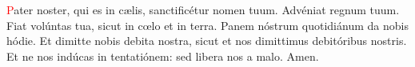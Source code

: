 \textcolor{red}{P}ater noster, qui es in c{\ae}lis, sanctificétur nomen tuum. Advéniat regnum tuum.
Fiat volúntas tua, sicut in c{\oe}lo et in terra. Panem nóstrum quotidiánum da nobis hódie.
Et dimitte nobis debita nostra, sicut et nos dimittimus debitóribus nostris.
Et ne nos indúcas in tentatiónem: sed libera nos a malo. Amen.